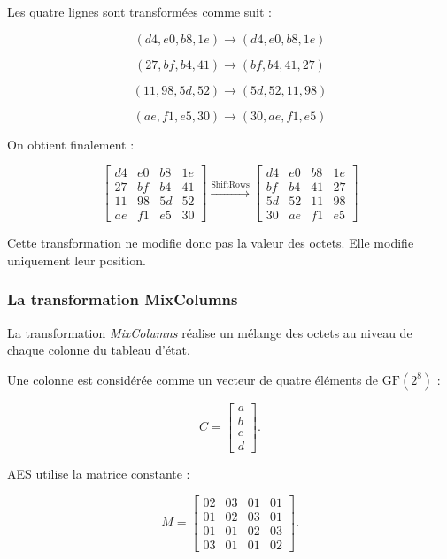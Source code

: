 \documentclass[12pt,a4paper]{article}
\begin{document}
Les quatre lignes sont transformées comme suit :

\[
(d4,e0,b8,1e)
\longrightarrow
(d4,e0,b8,1e)
\]

\[
(27,bf,b4,41)
\longrightarrow
(bf,b4,41,27)
\]

\[
(11,98,5d,52)
\longrightarrow
(5d,52,11,98)
\]

\[
(ae,f1,e5,30)
\longrightarrow
(30,ae,f1,e5)
\]

On obtient finalement :

\[
\boxed{
\begin{bmatrix}
d4&e0&b8&1e\\
27&bf&b4&41\\
11&98&5d&52\\
ae&f1&e5&30
\end{bmatrix}
\overset{\text{ShiftRows}}{\longrightarrow}
\begin{bmatrix}
d4&e0&b8&1e\\
bf&b4&41&27\\
5d&52&11&98\\
30&ae&f1&e5
\end{bmatrix}
}
\]

Cette transformation ne modifie donc pas la valeur des octets.
Elle modifie uniquement leur position.



\subsubsection{La transformation MixColumns}

La transformation \textit{MixColumns} réalise un mélange des octets
au niveau de chaque colonne du tableau d'état.

Une colonne est considérée comme un vecteur de quatre éléments de
$\mathrm{GF}(2^8)$ :

\[
C=
\begin{bmatrix}
a\\
b\\
c\\
d
\end{bmatrix}.
\]

AES utilise la matrice constante :

\[
M=
\begin{bmatrix}
02&03&01&01\\
01&02&03&01\\
01&01&02&03\\
03&01&01&02
\end{bmatrix}.
\]
\end{document}
